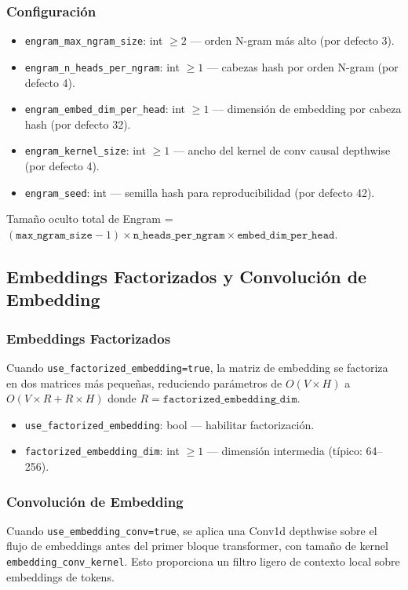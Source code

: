 \subsubsection{Configuración}
\begin{itemize}[leftmargin=*]
    \item \texttt{engram\_max\_ngram\_size}: int $\ge 2$ --- orden N-gram más alto (por defecto 3).
    \item \texttt{engram\_n\_heads\_per\_ngram}: int $\ge 1$ --- cabezas hash por orden N-gram (por defecto 4).
    \item \texttt{engram\_embed\_dim\_per\_head}: int $\ge 1$ --- dimensión de embedding por cabeza hash (por defecto 32).
    \item \texttt{engram\_kernel\_size}: int $\ge 1$ --- ancho del kernel de conv causal depthwise (por defecto 4).
    \item \texttt{engram\_seed}: int --- semilla hash para reproducibilidad (por defecto 42).
\end{itemize}
Tamaño oculto total de Engram = $(\texttt{max\_ngram\_size} - 1) \times \texttt{n\_heads\_per\_ngram} \times \texttt{embed\_dim\_per\_head}$.

\subsection{Embeddings Factorizados y Convolución de Embedding}

\subsubsection{Embeddings Factorizados}
Cuando \texttt{use\_factorized\_embedding=true}, la matriz de embedding se factoriza en dos matrices más pequeñas, reduciendo parámetros de $O(V \times H)$ a $O(V \times R + R \times H)$ donde $R = \texttt{factorized\_embedding\_dim}$.
\begin{itemize}[leftmargin=*]
    \item \texttt{use\_factorized\_embedding}: bool --- habilitar factorización.
    \item \texttt{factorized\_embedding\_dim}: int $\ge 1$ --- dimensión intermedia (típico: 64--256).
\end{itemize}

\subsubsection{Convolución de Embedding}
Cuando \texttt{use\_embedding\_conv=true}, se aplica una Conv1d depthwise sobre el flujo de embeddings antes del primer bloque transformer, con tamaño de kernel \texttt{embedding\_conv\_kernel}. Esto proporciona un filtro ligero de contexto local sobre embeddings de tokens.

